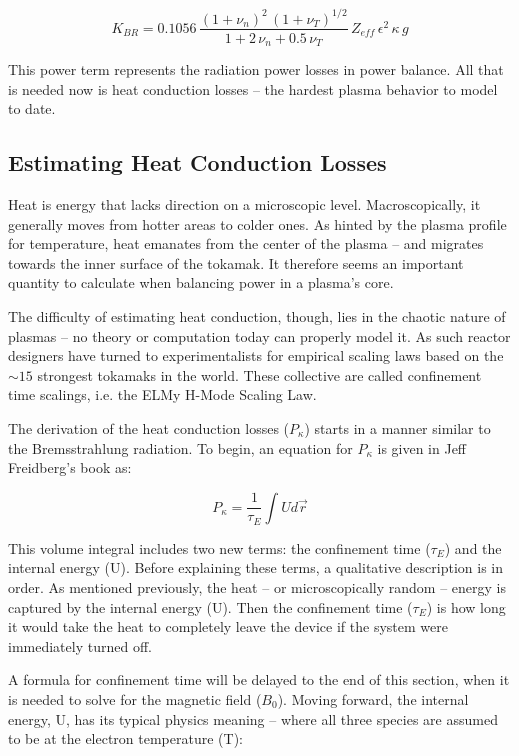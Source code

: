 \begin{equation}
	K_{BR} = 0.1056 \, \frac{ (1+\nu_n)^2 \, (1+\nu_T)^{1/2} }{1+2 \, \nu_n + 0.5 \, \nu_T} \, Z_{eff} \, \epsilon^2 \, \kappa \, g
\end{equation}

This power term represents the radiation power losses in power balance. All that is needed now is heat conduction losses -- the hardest plasma behavior to model to date.

\subsection{Estimating Heat Conduction Losses}

Heat is energy that lacks direction on a microscopic level. Macroscopically, it generally moves from hotter areas to colder ones. As hinted by the plasma profile for temperature, heat emanates from the center of the plasma -- and migrates towards the inner surface of the tokamak. It therefore seems an important quantity to calculate when balancing power in a plasma's core.

The difficulty of estimating heat conduction, though, lies in the chaotic nature of plasmas -- no theory or computation today can properly model it. As such reactor designers have turned to experimentalists for empirical scaling laws based on the $\sim15$ strongest tokamaks in the world. These collective are called confinement time scalings, i.e. the ELMy H-Mode Scaling Law.

The derivation of the heat conduction losses ($P_\kappa$) starts in a manner similar to the Bremsstrahlung radiation. To begin, an equation for $P_\kappa$ is given in Jeff Freidberg's book as:

\begin{equation}
	P_\kappa = \frac{1}{\tau_E} \int U d \vec r
\end{equation}

This volume integral includes two new terms: the confinement time ($\tau_E$) and the internal energy (U). Before explaining these terms, a qualitative description is in order. As mentioned previously, the heat -- or microscopically random -- energy is captured by the internal energy (U). Then the confinement time ($\tau_E$) is how long it would take the heat to completely leave the device if the system were immediately turned off.

A formula for confinement time will be delayed to the end of this section, when it is needed to solve for the magnetic field ($B_0$). Moving forward, the internal energy, U, has its typical physics meaning -- where all three species are assumed to be at the electron temperature (T):

